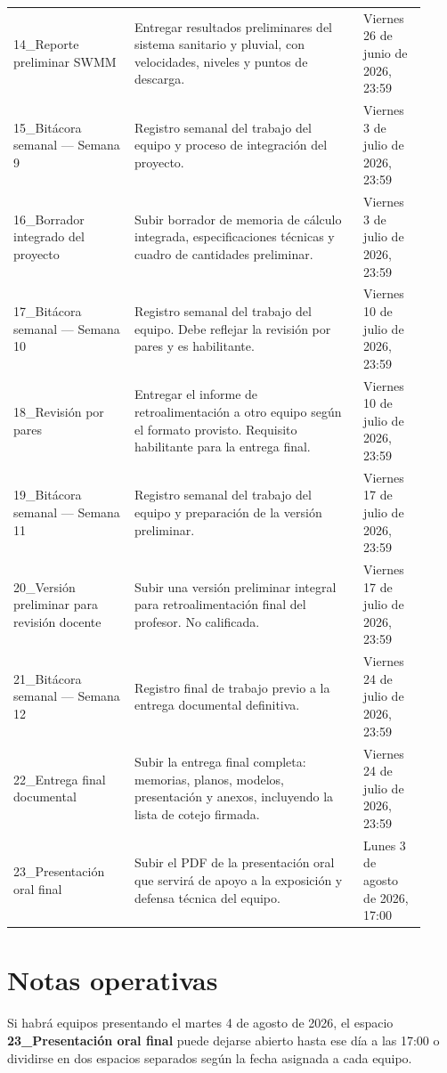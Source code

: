 \documentclass[11pt]{article}
\begin{document}
\begin{longtable}{p{0.27\linewidth} p{0.51\linewidth} p{0.14\linewidth}}
14\_Reporte preliminar SWMM & Entregar resultados preliminares del sistema sanitario y pluvial, con velocidades, niveles y puntos de descarga. & Viernes 26 de junio de 2026, 23:59 \\
15\_Bit\'acora semanal --- Semana 9 & Registro semanal del trabajo del equipo y proceso de integraci\'on del proyecto. & Viernes 3 de julio de 2026, 23:59 \\
16\_Borrador integrado del proyecto & Subir borrador de memoria de c\'alculo integrada, especificaciones t\'ecnicas y cuadro de cantidades preliminar. & Viernes 3 de julio de 2026, 23:59 \\
17\_Bit\'acora semanal --- Semana 10 & Registro semanal del trabajo del equipo. Debe reflejar la revisi\'on por pares y es habilitante. & Viernes 10 de julio de 2026, 23:59 \\
18\_Revisi\'on por pares & Entregar el informe de retroalimentaci\'on a otro equipo seg\'un el formato provisto. Requisito habilitante para la entrega final. & Viernes 10 de julio de 2026, 23:59 \\
19\_Bit\'acora semanal --- Semana 11 & Registro semanal del trabajo del equipo y preparaci\'on de la versi\'on preliminar. & Viernes 17 de julio de 2026, 23:59 \\
20\_Versi\'on preliminar para revisi\'on docente & Subir una versi\'on preliminar integral para retroalimentaci\'on final del profesor. No calificada. & Viernes 17 de julio de 2026, 23:59 \\
21\_Bit\'acora semanal --- Semana 12 & Registro final de trabajo previo a la entrega documental definitiva. & Viernes 24 de julio de 2026, 23:59 \\
22\_Entrega final documental & Subir la entrega final completa: memorias, planos, modelos, presentaci\'on y anexos, incluyendo la lista de cotejo firmada. & Viernes 24 de julio de 2026, 23:59 \\
23\_Presentaci\'on oral final & Subir el PDF de la presentaci\'on oral que servir\'a de apoyo a la exposici\'on y defensa t\'ecnica del equipo. & Lunes 3 de agosto de 2026, 17:00 \\
\bottomrule
\end{longtable}

\section{Notas operativas}
\begin{warnbox}
Si habr\'a equipos presentando el martes 4 de agosto de 2026, el espacio \textbf{23\_Presentaci\'on oral final} puede dejarse abierto hasta ese d\'ia a las 17:00 o dividirse en dos espacios separados seg\'un la fecha asignada a cada equipo.
\end{warnbox}
\end{document}
